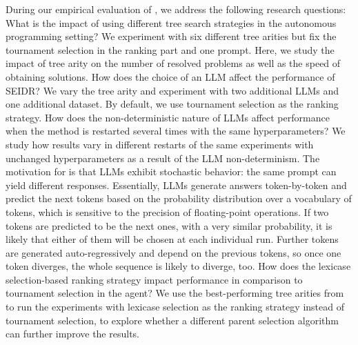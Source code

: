 During our empirical evaluation of \method{}, we address the following research questions:
What is the impact of using different tree search strategies
in the autonomous programming setting? 
We experiment with six different tree arities but fix the tournament selection in the ranking part and one prompt. 
Here, we study the impact of tree arity on the number of resolved problems as well as the speed of obtaining solutions.   
How does the choice of an LLM affect the performance of SEIDR? 
We vary the tree arity and experiment with two additional LLMs and one additional dataset.
By default, we use tournament selection as the ranking strategy. 
How does the non-deterministic nature of LLMs affect \method{} performance when the method is restarted several times with the same hyperparameters?
We study how \method{} results vary in different restarts of the same experiments with unchanged hyperparameters as a result of the LLM non-determinism. 
The motivation for \rqmultirun{} is that LLMs exhibit stochastic behavior: the same prompt can yield different responses. 
Essentially, LLMs generate answers token-by-token and predict the next tokens based on the probability distribution over a vocabulary of tokens, which is sensitive to the precision of floating-point operations. 
If two tokens are predicted to be the next ones, with a very similar probability, it is likely that either of them will be chosen at each individual run. 
Further tokens are generated auto-regressively and depend on the previous tokens, so once one token diverges, the whole sequence is likely to diverge, too. 
How does the lexicase selection-based ranking strategy impact performance in comparison to tournament selection in the \rank{} agent? 
We use the best-performing tree arities from \rqmultirun{} to run the experiments with lexicase selection as the ranking strategy instead of tournament selection, to explore whether a different parent selection algorithm can further improve the results.


